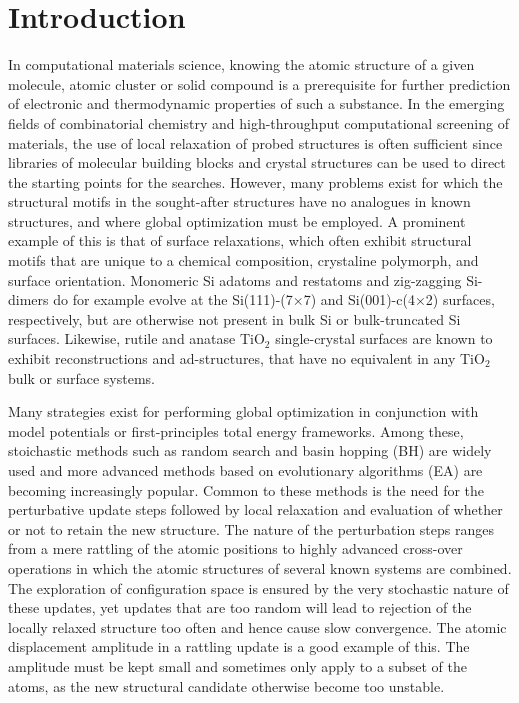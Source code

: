 \documentclass[aip,amsmath,amssymb,reprint]{revtex4-1}
\begin{document}
\section{\label{sec:introduction}Introduction}
In computational materials science, knowing the atomic structure of a
given molecule, atomic cluster or solid compound is a prerequisite for
further prediction of electronic and thermodynamic properties of such
a substance. In the emerging fields of combinatorial chemistry and
high-throughput computational screening of materials,\cite{curtarolo2013} the use of local
relaxation of probed structures is often sufficient since libraries of
molecular building blocks and crystal structures can be used to direct
the starting points for the searches.\cite{hafner2006} However, many problems exist for
which the structural motifs in the sought-after structures have no
analogues in known structures, and where global optimization must be
employed. A prominent example of this is that of surface relaxations,
which often exhibit structural motifs that are unique to a chemical
composition, crystaline polymorph, and surface orientation. Monomeric
Si adatoms and restatoms and zig-zagging Si-dimers do for example evolve at the
Si(111)-(7$\times$7) and Si(001)-c(4$\times$2) surfaces,\cite{si7x7,si4x2} respectively, but
are otherwise not present in bulk Si or bulk-truncated Si surfaces. Likewise,
rutile and anatase TiO$_2$ single-crystal surfaces are known to exhibit
reconstructions and ad-structures,\cite{anatase1,rutile1,rutile2} that have no equivalent in any TiO$_2$ bulk or surface systems.

Many strategies exist for performing global optimization in
conjunction with model potentials or first-principles total energy
frameworks. Among these, stoichastic methods such as random search\cite{pickard2011} and
basin hopping (BH)\cite{wales1997} are widely used and more advanced methods based on
evolutionary algorithms (EA) are becoming increasingly popular.\cite{johnston2003} Common
to these methods is the need for the perturbative update steps
followed by local relaxation and evaluation of whether or not to
retain the new structure. The nature of the perturbation steps ranges
from a mere rattling of the atomic positions to highly advanced
cross-over operations in which the atomic structures of several known
systems are combined.\cite{ho1995} The exploration of configuration space is
ensured by the very stochastic nature of these updates, yet updates
that are too random will lead to rejection of the locally
relaxed structure too often and hence cause slow convergence. The atomic
displacement amplitude in a rattling update is a good example of
this. The amplitude must be kept small and sometimes only apply to a
subset of the atoms, as the new structural candidate otherwise become
too unstable.
\end{document}

